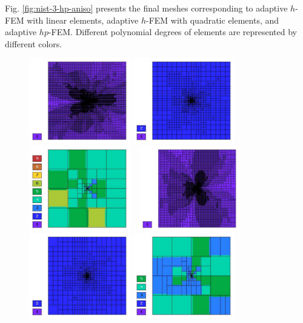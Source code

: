 \documentclass[12pt]{elsarticle}
\begin{document}
Fig. \ref{fig:nist-3-hp-aniso} presents the final meshes corresponding to adaptive $h$-FEM with
linear elements, adaptive $h$-FEM with quadratic elements, and adaptive $hp$-FEM. Different
polynomial degrees of elements are represented by different colors.

\begin{figure}[!ht]
\centering
\includegraphics[height=3.7cm]{mafig15.pdf}
\includegraphics[height=3.7cm]{mafig16.pdf}
\includegraphics[height=3.7cm]{mafig17.pdf}\ \
\includegraphics[height=3.7cm]{mafig18.pdf}
\includegraphics[height=3.7cm]{mafig19.pdf}
\includegraphics[height=3.7cm]{mafig20.pdf}

\end{figure}
\end{document}

